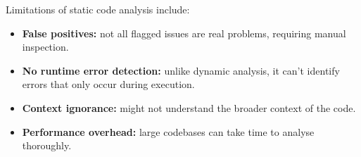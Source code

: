 \documentclass[a4paper,11pt]{article}
\begin{document}
Limitations of static code analysis include:
\begin{itemize}
    \item   \textbf{False positives:} not all flagged issues are real problems, requiring manual inspection.
    \item   \textbf{No runtime error detection:} unlike dynamic analysis, it can't identify errors that only occur during execution.
    \item   \textbf{Context ignorance:} might not understand the broader context of the code.
    \item   \textbf{Performance overhead:} large codebases can take time to analyse thoroughly.
\end{itemize}
\end{document}
